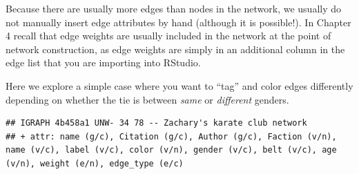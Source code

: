 \documentclass[
]{book}
\newenvironment{Shaded}{\begin{snugshade}}{\end{snugshade}}
\newcommand{\CommentTok}[1]{\textcolor[rgb]{0.56,0.35,0.01}{\textit{#1}}}
\newcommand{\FunctionTok}[1]{\textcolor[rgb]{0.13,0.29,0.53}{\textbf{#1}}}
\newcommand{\NormalTok}[1]{#1}
\newcommand{\OtherTok}[1]{\textcolor[rgb]{0.56,0.35,0.01}{#1}}
\newcommand{\SpecialCharTok}[1]{\textcolor[rgb]{0.81,0.36,0.00}{\textbf{#1}}}
\newcommand{\StringTok}[1]{\textcolor[rgb]{0.31,0.60,0.02}{#1}}
\begin{document}
Because there are usually more edges than nodes in the network, we usually do not manually insert edge attributes by hand (although it is possible!). In Chapter 4 recall that edge weights are usually included in the network at the point of network construction, as edge weights are simply in an additional column in the edge list that you are importing into RStudio.

Here we explore a simple case where you want to ``tag'' and color edges differently depending on whether the tie is between \emph{same} or \emph{different} genders.

\begin{Shaded}
\end{Shaded}

\begin{verbatim}
## IGRAPH 4b458a1 UNW- 34 78 -- Zachary's karate club network
## + attr: name (g/c), Citation (g/c), Author (g/c), Faction (v/n), name (v/c), label (v/c), color (v/n), gender (v/c), belt (v/c), age (v/n), weight (e/n), edge_type (e/c)
\end{verbatim}

\begin{Shaded}
\end{Shaded}
\end{document}
